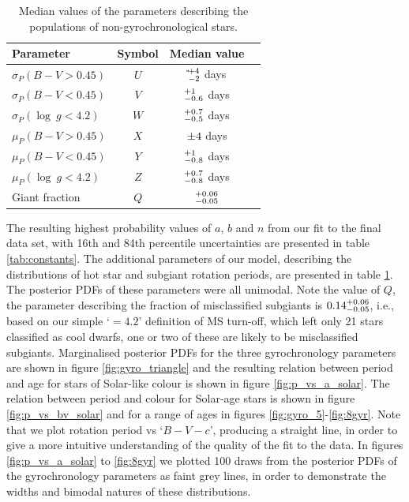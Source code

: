 \begin{table}
\caption[Nuisance parameter results]
{Median values of the parameters describing the populations of
	non-gyrochronological stars. \label{tab:nuisance}}

\begin{center}
\begin{tabular}{lccc}
\hline\hline
{Parameter} & {Symbol} & {Median value} \\
\hline
$\sigma_P (B-V > 0.45)$ & $U$ & \U$^{+4}_{-2}$ days \\
$\sigma_P (B-V < 0.45)$ & $V$ & \V$^{+1}_{-0.6}$ days \\
$\sigma_P (\log~g < 4.2)$ & $W$ & \W$^{+0.7}_{-0.5}$ days \\
$\mu_P (B-V > 0.45)$  & $X$ & \X$\pm4$ days \\
$\mu_P (B-V < 0.45)$ & $Y$ & \Y$^{+1}_{-0.8}$ days \\
$\mu_P (\log~g < 4.2)$ & $Z$ & \Z$^{+0.7}_{-0.8}$ days \\
Giant fraction & $Q$ & \Q$^{+0.06}_{-0.05}$ \\
\hline
\end{tabular}
\end{center}
\end{table}

The resulting highest probability values of $a$, $b$ and $n$ from our fit to
the final data set, with 16th and 84th percentile uncertainties are
presented in table \ref{tab:constants}.
The additional parameters of our model, describing the distributions of hot
star and subgiant rotation periods, are presented in table \ref{tab:nuisance}.
The posterior PDFs of these parameters were all unimodal.
Note the value of $Q$, the parameter describing the fraction of misclassified
subgiants is $0.14^{+0.06}_{-0.05}$, i.e., based on our simple `\logg$=4.2$'
definition of MS turn-off, which left only 21 stars classified as cool dwarfs,
one or two of these are likely to be misclassified subgiants.
Marginalised posterior PDFs for the three gyrochronology parameters are shown
in figure \ref{fig:gyro_triangle} and the resulting relation between period and age
for stars of Solar-like colour is shown in figure \ref{fig:p_vs_a_solar}.
The relation between period and colour for Solar-age stars is shown in figure
\ref{fig:p_vs_bv_solar} and for a range of ages in figures
\ref{fig:gyro_5}-\ref{fig:8gyr}.
Note that we plot rotation period vs `$B-V-c$', producing a straight line, in
order to give a more intuitive understanding of the quality of the fit to the
data.
In figures \ref{fig:p_vs_a_solar} to \ref{fig:8gyr} we plotted 100 draws from
the posterior PDFs of the gyrochronology parameters as faint grey lines,
in order to demonstrate the widths and bimodal natures of these distributions.

